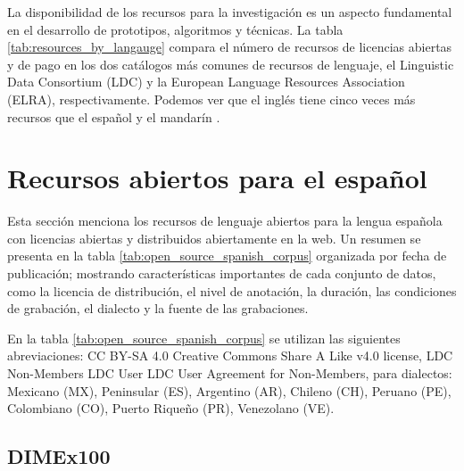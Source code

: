 La disponibilidad de los recursos para la investigación es un aspecto fundamental en el desarrollo de prototipos, algoritmos y técnicas. La tabla \ref{tab:resources_by_langauge} compara el n\'umero de recursos de licencias abiertas y de pago en los dos catálogos más comunes de recursos de lenguaje, el Linguistic Data Consortium (LDC) y la European Language Resources Association (ELRA), respectivamente. Podemos ver que el inglés tiene cinco veces más recursos que el español y el mandarín \cite{HernndezMena2017}.





\section{Recursos abiertos para el español}

Esta sección menciona los recursos de lenguaje abiertos para la lengua española con licencias abiertas y distribuidos abiertamente en la web. Un resumen se presenta en la tabla \ref{tab:open_source_spanish_corpus} organizada por fecha de publicación; mostrando características importantes de cada conjunto de datos, como la licencia de distribución, el nivel de anotación, la duración, las condiciones de grabación, el dialecto y la fuente de las grabaciones.

En la tabla \ref{tab:open_source_spanish_corpus} se utilizan las siguientes abreviaciones:  CC BY-SA 4.0 Creative Commons Share A Like v4.0 license, LDC Non-Members LDC User LDC User Agreement for Non-Members, para dialectos: Mexicano (MX), Peninsular (ES), Argentino (AR), Chileno (CH), Peruano (PE), Colombiano (CO), Puerto Riqueño (PR), Venezolano (VE). 



\subsection{DIMEx100}

